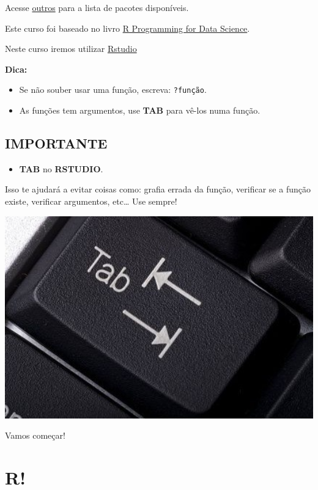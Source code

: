 \documentclass[]{book}
\providecommand{\tightlist}{%
  \setlength{\itemsep}{0pt}\setlength{\parskip}{0pt}}
\begin{document}
Acesse
\href{https://cran.r-project.org/web/packages/available_packages_by_name.html}{outros}
para a lista de pacotes disponíveis.

Este curso foi baseado no livro
\href{https://leanpub.com/rprogramming}{R Programming for Data Science}.

Neste curso iremos utilizar \href{https://www.rstudio.com/}{Rstudio}

\textbf{Dica:}

\begin{itemize}
\tightlist
\item
  Se não souber usar uma função, escreva: \texttt{?função}.
\item
  As funções tem argumentos, use \textbf{TAB} para vê-los numa função.
\end{itemize}

\section{IMPORTANTE}\label{importante}

\begin{itemize}
\tightlist
\item
  \textbf{TAB} no \textbf{RSTUDIO}.
\end{itemize}

Isso te ajudará a evitar coisas como: grafia errada da função, verificar
se a função existe, verificar argumentos, etc\ldots{} Use sempre!

\includegraphics[width=5.88in]{figuras/tab-key-}

Vamos começar!

\chapter{R!}\label{r}
\end{document}

